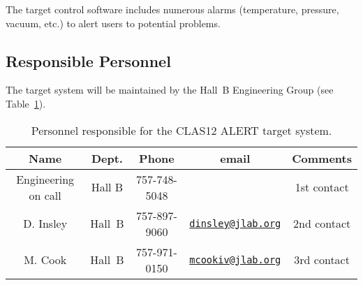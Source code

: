 The target control software includes numerous alarms (temperature, pressure, vacuum, etc.) to alert users
to potential problems.

\subsection{Responsible Personnel}

The target system will be maintained by the Hall~B Engineering Group (see Table~\ref{tb:target}).  

\begin{table}[!htb]
\centering
\begin{tabular}{|c|c|c|c|c|}
\hline
Name & Dept. & Phone & email & Comments \\ \hline
Engineering on call & Hall B & 757-748-5048 & & 1st contact \\ \hline
D. Insley & Hall~B  &757-897-9060&\href{mailto:dinsley@jlab.org}{\nolinkurl{dinsley@jlab.org}} & 2nd contact \\ \hline
M. Cook   & Hall~B  &757-971-0150&\href{mailto:mcookiv@jlab.org}{\nolinkurl{mcookiv@jlab.org}} & 3rd contact \\ \hline
\end{tabular}
\caption{Personnel responsible for the CLAS12 ALERT target system.} 
\label{tb:target}
\end{table}
